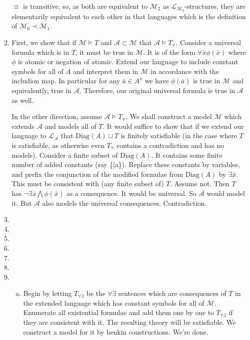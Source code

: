 \documentclass[10pt]{article}
\newcommand{\A}{\forall}
\newcommand{\mcA}{\mathcal{A}}
\newcommand{\mcM}{\mathcal{M}}
\newcommand{\mcL}{\mathcal{L}}
\newcommand{\E}{\exists}
\begin{document}
\begin{enumerate}[1.]
\(\equiv\) is transitive, so, as both are equivalent to \(\mcM_2\) as \(\mcL_{\mcM_0}\)-structures, they are elementarily equivalent to each other in that languages which is the definition of \(\mcM_0 \prec \mcM_1\). 
 

\item First, we show that if \(\mcM \models T\) and \(\mcA \subset \mcM\) that \(\mcA \models T_\A\). Consider a universal formula which is in \(T\), it must be true in \(\mcM\). It is of the form \(\A\bar{x}\phi(\bar{x})\) where \(\phi\) is atomic or negation of atomic. Extend our language to include constant symbols for all of \(A\) and interpret them in \(\mcM\) in accordance with the includion map. In particular for any \(\bar{a} \in A^n\) we have \(\phi(\bar{a})\) is true in \(\mcM\) and equivalently, true in \(\mcA\). Therefore, our original universal formula is true in \(\mcA\) as well. 

In the other direction, assume \(\mcA \models T_\A\). We shall construct a model \(\mcM\) which extends \(\mcA\) and models all of \(T\). It would suffice to show that if we extend our language to \(\mcL_\mcA\) that \(\text{Diag}(A) \cup T\) is finitely satisfiable (in the case where \(T\) is satisfiable, as otherwise even \(T_\A\) contains a contradiction and has no models). Consider a finite subset of \(\text{Diag}(A)\). It contains some finite number of added constants (say \{\bar{a}\}). Replace these constants by variables, and prefix the conjunction of the modified formulae from \(\text{Diag}(A)\) by \(\E\bar{x}\). This must be consistent with (any finite subset of) \(T\). Assume not. Then \(T\) has \(\neg\E\bar{x}\bigwedge \phi(\bar{x})\) as a consequence. It would be universal. So \(\mcA\) would model it. But \(\mcA\) also models the universal consequences. Contradiction.   

\item
 
\item
 
\item
 
\item
 
\item

\item
 
\item 
  \begin{enumerate}[a)]
  \item Begin by letting \(T_{\A\E}\) be the \(\A\E\) sentences which are consequences of \(T\) in the extended language which has constant symbols for all of \(\mcM\). 
Enumerate all existential formulae and add them one by one to \(T_{\A\E}\) if they are consistent with it. 
The resulting theory will be satisfiable. 
We construct a model for it by henkin constructions. We're done. 


\end{enumerate}
\end{enumerate}
\end{document}
